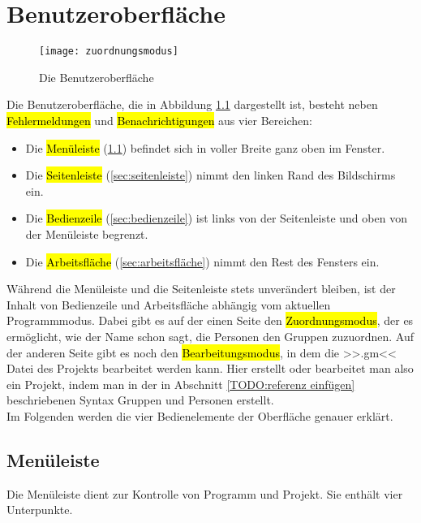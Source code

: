 \chapter{Benutzeroberfläche}
\label{ch:benutzeroberfläche}

\begin{figure}
	\texttt{[image: zuordnungsmodus]}
	\caption{Die Benutzeroberfläche}
	\label{fig:die_benutzeroberfläche}
\end{figure}

Die Benutzeroberfläche, die in Abbildung \ref{fig:die_benutzeroberfläche} dargestellt ist, besteht neben \hl{Fehlermeldungen} und \hl{Benachrichtigungen} aus vier Bereichen:
\begin{itemize}
	\item Die \hl{Menüleiste} (\ref{sec:menüleiste}) befindet sich in voller Breite ganz oben im Fenster.
	\item Die \hl{Seitenleiste} (\ref{sec:seitenleiste}) nimmt den linken Rand des Bildschirms ein.
	\item Die \hl{Bedienzeile} (\ref{sec:bedienzeile}) ist links von der Seitenleiste und oben von der Menüleiste begrenzt.
	\item Die \hl{Arbeitsfläche} (\ref{sec:arbeitsfläche}) nimmt den Rest des Fensters ein.
\end{itemize}
Während die Menüleiste und die Seitenleiste stets unverändert bleiben, ist der Inhalt von Bedienzeile und Arbeitsfläche abhängig vom aktuellen Programmmodus. Dabei gibt es auf der einen Seite den \hl{Zuordnungsmodus}, der es ermöglicht, wie der Name schon sagt, die Personen den Gruppen zuzuordnen. Auf der anderen Seite gibt es noch den \hl{Bearbeitungsmodus}, in dem die >>.gm<< Datei des Projekts bearbeitet werden kann. Hier erstellt oder bearbeitet man also ein Projekt, indem man in der in Abschnitt \ref{TODO:referenz einfügen} beschriebenen Syntax Gruppen und Personen erstellt.\\
Im Folgenden werden die vier Bedienelemente der Oberfläche genauer erklärt.

\section{Menüleiste}
\label{sec:menüleiste}

Die Menüleiste dient zur Kontrolle von Programm und Projekt. Sie enthält vier Unterpunkte.

